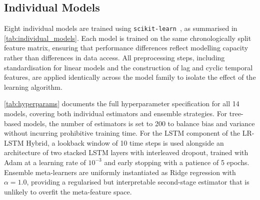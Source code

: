 \documentclass[a4paper,fleqn]{cas-dc}
\begin{document}
\subsection{Individual Models}

Eight individual models are trained using \texttt{scikit-learn}~\cite{scikit-learn}, as summarised in \autoref{tab:individual_models}.  Each model is trained on the same chronologically split feature matrix, ensuring that performance differences reflect modelling capacity rather than differences in data access.  All preprocessing steps, including standardisation for linear models and the construction of lag and cyclic temporal features, are applied identically across the model family to isolate the effect of the learning algorithm.

\autoref{tab:hyperparams} documents the full hyperparameter specification for all 14 models, covering both individual estimators and ensemble strategies.  For tree-based models, the number of estimators is set to 200 to balance bias and variance without incurring prohibitive training time.  For the LSTM component of the LR-LSTM Hybrid, a lookback window of 10 time steps is used alongside an architecture of two stacked LSTM layers with interleaved dropout, trained with Adam at a learning rate of $10^{-3}$ and early stopping with a patience of 5 epochs.  Ensemble meta-learners are uniformly instantiated as Ridge regression with $\alpha{=}1.0$, providing a regularised but interpretable second-stage estimator that is unlikely to overfit the meta-feature space.
\end{document}
